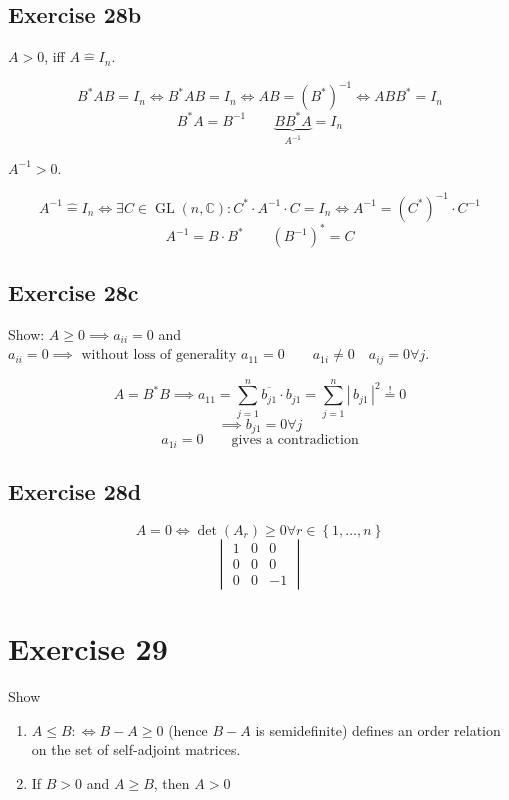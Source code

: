 \documentclass[a4paper]{article}
\theoremstyle{definition}
\newcommand\set[1]{\left\{#1\right\}}
\newcommand\card[1]{\left|\,#1\,\right|}
\begin{document}
\subsection{Exercise 28b}

$A > 0$, iff $A \hat= I_n$.

\[ B^* AB = I_n \iff B^* AB = I_n \iff AB = (B^*)^{-1} \iff ABB^* = I_n \]
\[ B^*A = B^{-1} \qquad \underbrace{BB^* A}_{A^{-1}} = I_n \]

$A^{-1} > 0$.

\[ A^{-1} \hat= I_n \iff \exists C \in \operatorname{GL}(n, \mathbb C): C^* \cdot A^{-1} \cdot C = I_n \iff A^{-1} = (C^*)^{-1} \cdot C^{-1} \]
\[ A^{-1} = B \cdot B^* \qquad (B^{-1})^* = C \]

\subsection{Exercise 28c}

Show: $A \geq 0 \implies a_{ii} = 0$ and $a_{ii} = 0 \implies \text{ without loss of generality } a_{11} = 0 \qquad a_{1i} \neq 0 \quad a_{ij} = 0 \forall j$.

\[ A = B^* B \implies a_{11} = \sum_{j=1}^n \overline{b_{j1}} \cdot b_{j1} = \sum_{j=1}^n \card{b_{j1}}^2 \overset!= 0 \]
\[ \implies b_{j1} = 0 \forall j \]
\[ a_{1i} = 0 \qquad \text{gives a contradiction} \]

\subsection{Exercise 28d}

\[ A = 0 \iff \det(A_r) \geq 0 \forall r \in \set{1, \ldots, n} \]
\[
  \begin{vmatrix}
    1 & 0 & 0 \\
    0 & 0 & 0 \\
    0 & 0 & -1
  \end{vmatrix}
\]

\section{Exercise 29}
\begin{ex}
  Show
  \begin{enumerate}
    \item $A \leq B :\iff B - A \geq 0$ (hence $B-A$ is semidefinite) defines an order relation on the set of self-adjoint matrices.
    \item If $B > 0$ and $A \geq B$, then $A > 0$
  \end{enumerate}
\end{ex}
\end{document}
